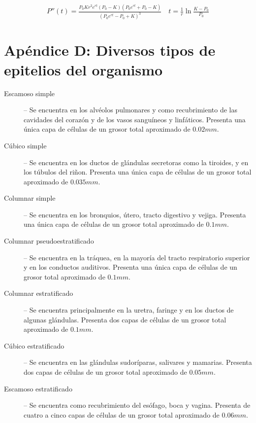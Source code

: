 \begin{appendixes}
    \begin{align*}
    \boxed{P''(t) = \displaystyle\frac{P_0 K r^2 e^{rt} (P_0-K)(P_0 e^{rt} + P_0 - K)}{(P_0 e^{rt} - P_0 + K)^3}} \quad \boxed{t = \displaystyle\frac{1}{r} \ln \displaystyle\frac{K-P_0}{P_0}}
    \end{align*}
    
    \section{Ap\'endice D: Diversos tipos de epitelios del organismo}
    \label{app-d}
    
    \begin{description}
    \item [Escamoso simple] -- Se encuentra en los alv\'eolos pulmonares y como recubrimiento de las cavidades del coraz\'on y de los vasos sangu\'ineos y linf\'aticos. Presenta una \'unica capa de c\'elulas de un grosor total aproximado de $0$.$02mm$.
    
    \item [C\'ubico simple] -- Se encuentra en los ductos de gl\'andulas secretoras como la tiroides, y en los t\'ubulos del ri\~non. Presenta una \'unica capa de c\'elulas de un grosor total aproximado de $0$.$035mm$.
    
    \item [Columnar simple] -- Se encuentra en los bronquios, \'utero, tracto digestivo y vejiga. Presenta una \'unica capa de c\'elulas de un grosor total aproximado de $0$.$1mm$.
    
    \item [Columnar pseudoestratificado] -- Se encuentra en la tr\'aquea, en la mayor\'ia del tracto respiratorio superior y en los conductos auditivos. Presenta una \'unica capa de c\'elulas de un grosor total aproximado de $0$.$1mm$.
    
    \item [Columnar estratificado] -- Se encuentra principalmente en la uretra, faringe y en los ductos de algunas gl\'andulas. Presenta dos capas de c\'elulas de un grosor total aproximado de $0$.$1mm$.
    
    \item [C\'ubico estratificado] -- Se encuentra en las gl\'andulas sudor\'iparas, salivares y mamarias. Presenta dos capas de c\'elulas de un grosor total aproximado de $0$.$05mm$.
    
    \item [Escamoso estratificado] -- Se encuentra como recubrimiento del es\'ofago, boca y vagina. Presenta de cuatro a cinco capas de c\'elulas de un grosor total aproximado de $0$.$06mm$.
    

\end{description}
\end{appendixes}
